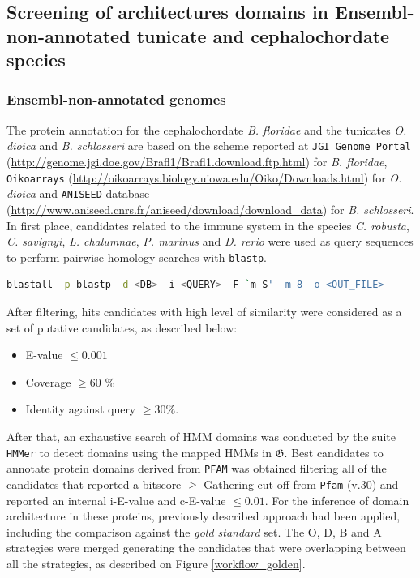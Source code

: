 \documentclass[11pt]{article}
\begin{document}
\subsection*{Screening of architectures domains in Ensembl-non-annotated 
tunicate and cephalochordate species}

\subsubsection*{Ensembl-non-annotated genomes}

The protein annotation for the cephalochordate \textsl{B. floridae} and 
the tunicates \textsl{O. dioica} and \textsl{B. schlosseri} are based on the 
scheme reported at \texttt{JGI Genome Portal} 
(\url{http://genome.jgi.doe.gov/Brafl1/Brafl1.download.ftp.html}) for \textsl{B. 
floridae}, \texttt{Oikoarrays} 
(\url{http://oikoarrays.biology.uiowa.edu/Oiko/Downloads.html}) for \textsl{O. 
dioica} and \texttt{ANISEED} database 
(\url{http://www.aniseed.cnrs.fr/aniseed/download/download_data}) for \textsl{B. 
schlosseri}. In first place, candidates related to the immune system in the 
species \textit{C. robusta}, \textsl{C. savignyi}, \textsl{L. chalumnae}, 
\textsl{P. marinus} and \textit{D. rerio} were used as query sequences to 
perform pairwise homology searches with \texttt{blastp}.

\begin{lstlisting}[language=bash, breaklines=true]
blastall -p blastp -d <DB> -i <QUERY> -F `m S' -m 8 -o <OUT_FILE>
\end{lstlisting}

After filtering, hits candidates with high level of similarity were 
considered as a set of putative candidates, as described below:

\begin{itemize}
\item E-value $\leq 0.001$
\item Coverage $\geq 60$ \%
\item Identity against query $\geq 30$\%.
\end{itemize}

After that, an exhaustive search of HMM domains was conducted by the suite 
\texttt{HMMer} to detect domains using the mapped HMMs in 
$\boldsymbol{\mathfrak{G}}$. Best candidates to annotate protein domains 
derived from \texttt{PFAM} was obtained filtering all of the candidates that 
reported a bitscore $\geq$ Gathering cut-off from \texttt{Pfam} (v.30) and 
reported an internal i-E-value and c-E-value $\leq 0.01$. For the inference of 
domain architecture in these proteins, previously described approach had been 
applied, including the comparison against the \textsl{gold standard} set. The O, 
D, B and A strategies were merged generating the candidates that were 
overlapping between all the strategies, as described on Figure 
\ref{workflow_golden}.
\end{document}
